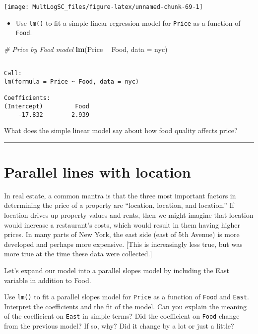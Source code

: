 \documentclass[]{book}
\newenvironment{Shaded}{\begin{snugshade}}{\end{snugshade}}
\newcommand{\KeywordTok}[1]{\textcolor[rgb]{0.13,0.29,0.53}{\textbf{#1}}}
\newcommand{\DataTypeTok}[1]{\textcolor[rgb]{0.13,0.29,0.53}{#1}}
\newcommand{\StringTok}[1]{\textcolor[rgb]{0.31,0.60,0.02}{#1}}
\newcommand{\CommentTok}[1]{\textcolor[rgb]{0.56,0.35,0.01}{\textit{#1}}}
\newcommand{\OperatorTok}[1]{\textcolor[rgb]{0.81,0.36,0.00}{\textbf{#1}}}
\newcommand{\NormalTok}[1]{#1}
\providecommand{\tightlist}{%
  \setlength{\itemsep}{0pt}\setlength{\parskip}{0pt}}
\begin{document}
\begin{center}\texttt{[image: MultLogSC\_files/figure-latex/unnamed-chunk-69-1]} \end{center}

\begin{itemize}
\tightlist
\item
  Use \texttt{lm()} to fit a simple linear regression model for
  \texttt{Price} as a function of \texttt{Food}.
\end{itemize}

\begin{Shaded}
\begin{Highlighting}[]
\CommentTok{# Price by Food model}
\KeywordTok{lm}\NormalTok{(Price }\OperatorTok{~}\StringTok{ }\NormalTok{Food, }\DataTypeTok{data =}\NormalTok{ nyc)}
\end{Highlighting}
\end{Shaded}

\begin{verbatim}

Call:
lm(formula = Price ~ Food, data = nyc)

Coefficients:
(Intercept)         Food  
    -17.832        2.939  
\end{verbatim}

What does the simple linear model say about how food quality affects
price?

\begin{center}\rule{0.5\linewidth}{\linethickness}\end{center}

\section{Parallel lines with
location}\label{parallel-lines-with-location}

In real estate, a common mantra is that the three most important factors
in determining the price of a property are ``location, location, and
location.'' If location drives up property values and rents, then we
might imagine that location would increase a restaurant's costs, which
would result in them having higher prices. In many parts of New York,
the east side (east of 5th Avenue) is more developed and perhaps more
expensive. {[}This is increasingly less true, but was more true at the
time these data were collected.{]}

Let's expand our model into a parallel slopes model by including the
East variable in addition to Food.

Use \texttt{lm()} to fit a parallel slopes model for \texttt{Price} as a
function of \texttt{Food} and \texttt{East}. Interpret the coefficients
and the fit of the model. Can you explain the meaning of the coefficient
on \texttt{East} in simple terms? Did the coefficient on \texttt{Food}
change from the previous model? If so, why? Did it change by a lot or
just a little?
\end{document}
